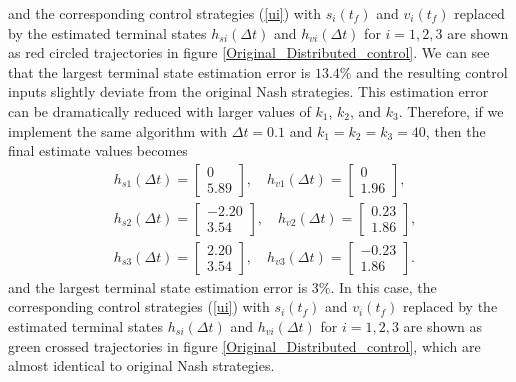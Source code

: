 \documentclass[letterpaper, 10 pt, conference,onecolumn]{ieeeconf}  %
\begin{document}
and the corresponding control strategies (\ref{ui}) with $s_i(t_f)$ and $v_i(t_f)$ replaced by the estimated terminal states $h_{si}(\Delta t)$ and $h_{vi}(\Delta t)$ for $i=1,2,3$ are shown as red circled trajectories in figure \ref{Original_Distributed_control}. We can see that the largest terminal state estimation error is $13.4\%$ and the resulting control inputs slightly deviate from the original Nash strategies. This estimation error can be dramatically reduced with larger values of $k_1$, $k_2$, and $k_3$. Therefore, if we implement the same algorithm with $\Delta t=0.1$ and $k_1=k_2=k_3=40$, then the final estimate values becomes
\begin{align*}
&h_{s1}(\Delta t)=\begin{bmatrix}
 0\\
    5.89
\end{bmatrix},\quad h_{v1}(\Delta t)=\begin{bmatrix}
   0\\
    1.96
\end{bmatrix},\\
&h_{s2}(\Delta t)=\begin{bmatrix}
 -2.20\\    3.54
\end{bmatrix},\quad h_{v2}(\Delta t)=\begin{bmatrix}
 0.23\\
    1.86
\end{bmatrix},\\
&h_{s3}(\Delta t)=\begin{bmatrix}
 2.20\\3.54
\end{bmatrix},\quad h_{v3}(\Delta t)=\begin{bmatrix}
-0.23\\    1.86
\end{bmatrix}.
\end{align*}
and the largest terminal state estimation error is $3\%$. In this case, the corresponding control strategies (\ref{ui}) with $s_i(t_f)$ and $v_i(t_f)$ replaced by the estimated terminal states $h_{si}(\Delta t)$ and $h_{vi}(\Delta t)$ for $i=1,2,3$ are shown as green crossed trajectories in figure \ref{Original_Distributed_control}, which are almost identical to original Nash strategies.
\end{document}

